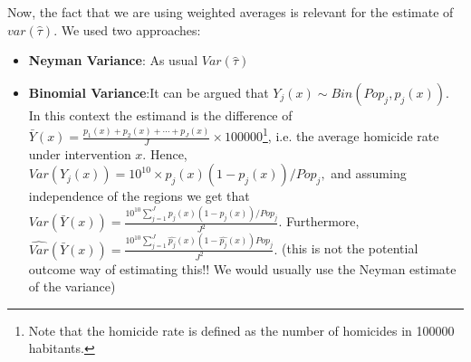 \documentclass{article}[11 pt]
\begin{document}
% 
% 

Now, the fact that we are using weighted averages is relevant for the estimate of $var(\hat{\tau}).$ We used two approaches:
\begin{itemize}
	\item \textbf{Neyman Variance}: As usual $Var(\hat{\tau})$
	
	\item \textbf{Binomial Variance}:It can be argued that $Y_j(x)\sim Bin(Pop_j,p_j(x))$. In this context the estimand is the difference of $\bar{Y}(x)=\frac{p_1(x)+p_2(x)+\cdots+p_J(x)}{J}\times 100000$\footnote{Note that the homicide rate is defined as the number of homicides in 100000 habitants.}, i.e. the average homicide rate under intervention $x$. Hence, 
$Var(Y_j(x))=10^{10}\times p_j(x)(1-p_j(x))/Pop_j ,$ and assuming independence of the regions we get that
$Var(\bar{Y}(x))=\frac{10^{10}\sum_{j=1}^Jp_j(x)(1-p_j(x))/Pop_j}{J^2}.$
Furthermore, $\hat{Var}(\bar{Y}(x))=\frac{10^{10}\sum_{j=1}^J\hat{p_j}(x)(1-\hat{p_j}(x))Pop_j}{J^2}.$ (this is not the potential outcome way of estimating this!! We would usually use the Neyman estimate of the variance)
\end{itemize}
\end{document}
